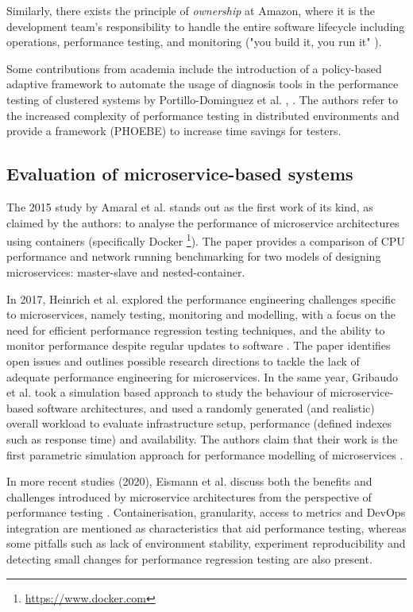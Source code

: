 Similarly, there exists the principle of \textit{ownership} at Amazon, where it is the development team's responsibility to handle the entire software lifecycle including operations, performance testing, and monitoring ("you build it, you run it" \cite{ohanlon06}). 

Some contributions from academia include the introduction of a policy-based adaptive framework
to automate the usage of diagnosis tools in the performance testing of clustered systems by Portillo-Dominguez et al. \cite{portillo14}, \cite{portillo17}. The authors refer to the increased complexity of performance testing in distributed environments and provide a framework (PHOEBE) to increase time savings for testers.

\subsection{Evaluation of microservice-based systems}

The 2015 study by Amaral et al. \cite{amaral15} stands out as the first work of its kind, as claimed by the authors: to analyse the performance of microservice architectures using containers (specifically Docker \footnote{\url{https://www.docker.com}}). The paper provides a comparison of CPU performance and network running benchmarking for two models of designing microservices: master-slave and nested-container. 

In 2017, Heinrich et al. explored the performance engineering challenges specific to microservices, namely testing, monitoring and modelling, with a focus on the need for efficient performance regression testing techniques, and the ability to monitor performance despite regular updates to software \cite{heinrich17}. The paper identifies open issues and outlines possible research directions to tackle the lack of adequate performance engineering for microservices.  In the same year, Gribaudo et al. took a simulation based approach to study the behaviour of microservice-based software architectures, and used a randomly generated (and realistic) overall workload to evaluate infrastructure setup, performance (defined indexes such as response time) and availability. The authors claim that their work is the first parametric simulation approach for performance modelling of microservices \cite{gribaudo17}.

In more recent studies (2020), Eismann et al. discuss both the benefits and challenges introduced by microservice architectures from the perspective of performance testing \cite{eismann20}. Containerisation, granularity, access to metrics and DevOps integration are mentioned as characteristics that aid performance testing, whereas some pitfalls such as lack of environment stability, experiment reproducibility and detecting small changes for performance regression testing are also present. 

